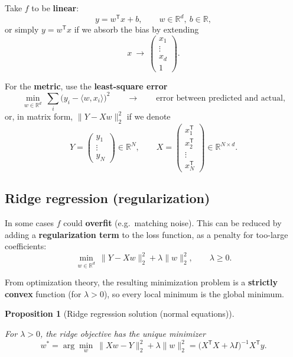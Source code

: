 \documentclass[
  letterpaper,
  DIV=11,
  numbers=noendperiod]{scrreprt}
\theoremstyle{definition}
\theoremstyle{plain}
\theoremstyle{plain}
\newtheorem{proposition}{Proposition}[chapter]
\theoremstyle{definition}
\theoremstyle{plain}
\theoremstyle{plain}
\theoremstyle{remark}
\begin{document}
Take \(f\) to be \textbf{linear}: \[
y = w^{\mathsf T} x + b, \qquad w \in \mathbb{R}^d,\ b \in \mathbb{R},
\] or simply \(y = w^{\mathsf T} x\) if we absorb the bias by extending
\[
x \ \longrightarrow\ \begin{pmatrix} x_1 \\ \vdots \\ x_d \\ 1 \end{pmatrix} .
\]

For the \textbf{metric}, use the \textbf{least-square error} \[
\min_{w \in \mathbb{R}^d} \ \sum_i \big(y_i - \langle w, x_i\rangle\big)^2
\qquad\longrightarrow\qquad \text{error between predicted and actual,}
\] or, in matrix form, \(\|Y - Xw\|_2^2\) if we denote \[
Y = \begin{pmatrix} y_1 \\ \vdots \\ y_N \end{pmatrix} \in \mathbb{R}^N,
\qquad
X = \begin{pmatrix} x_1^{\mathsf T} \\ x_2^{\mathsf T} \\ \vdots \\ x_N^{\mathsf T} \end{pmatrix} \in \mathbb{R}^{N \times d} .
\]

\subsection{Ridge regression
(regularization)}\label{ridge-regression-regularization}

In some cases \(f\) could \textbf{overfit} (e.g.~matching noise). This
can be reduced by adding a \textbf{regularization term} to the loss
function, as a penalty for too-large coefficients: \[
\min_{w \in \mathbb{R}^d} \ \|Y - Xw\|_2^2 + \lambda \|w\|_2^2, \qquad \lambda \ge 0 .
\]

From optimization theory, the resulting minimization problem is a
\textbf{strictly convex} function (for \(\lambda > 0\)), so every local
minimum is the global minimum.

\begin{proposition}[Ridge regression solution (normal
equations)]\protect\hypertarget{prp-ridge-solution}{}\label{prp-ridge-solution}

For \(\lambda > 0\), the ridge objective has the unique minimizer \[
w^\ast = \arg\min_w \ \|Xw - Y\|_2^2 + \lambda \|w\|_2^2
= \big(X^{\mathsf T} X + \lambda I\big)^{-1} X^{\mathsf T} y .
\]

\end{proposition}
\end{document}
